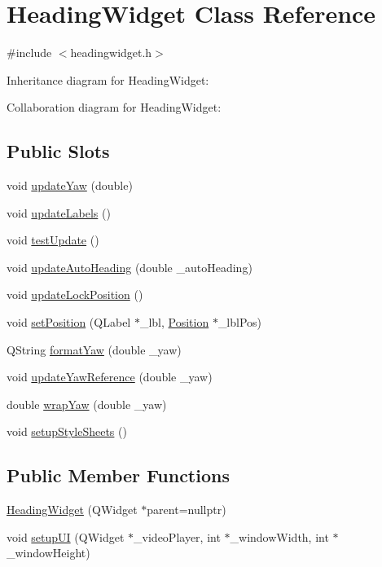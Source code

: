 \hypertarget{class_heading_widget}{}\section{Heading\+Widget Class Reference}
\label{class_heading_widget}


{\ttfamily \#include $<$headingwidget.\+h$>$}



Inheritance diagram for Heading\+Widget\+:


Collaboration diagram for Heading\+Widget\+:
\subsection*{Public Slots}
\begin{DoxyCompactItemize}
\item 
void \mbox{\hyperlink{class_heading_widget_a0ee18df2412d99bd9c2effe300679a6d}{update\+Yaw}} (double)
\item 
void \mbox{\hyperlink{class_heading_widget_a5970ad0efbbc29f3f1cc4222af237090}{update\+Labels}} ()
\item 
void \mbox{\hyperlink{class_heading_widget_a78bb0235f0f713e6d15367e257ec4957}{test\+Update}} ()
\item 
void \mbox{\hyperlink{class_heading_widget_aa83d96e53fc9087d61faa7ee9e812b16}{update\+Auto\+Heading}} (double \+\_\+auto\+Heading)
\item 
void \mbox{\hyperlink{class_heading_widget_abd5cbfa77478ba28e70c44f67fa6bd6f}{update\+Lock\+Position}} ()
\item 
void \mbox{\hyperlink{class_heading_widget_af5b9fd1a9b6268a73a486529e92ca9b1}{set\+Position}} (Q\+Label $\ast$\+\_\+lbl, \mbox{\hyperlink{class_position}{Position}} $\ast$\+\_\+lbl\+Pos)
\item 
Q\+String \mbox{\hyperlink{class_heading_widget_a9e14fb07916e6b5d242fb20695d5cc05}{format\+Yaw}} (double \+\_\+yaw)
\item 
void \mbox{\hyperlink{class_heading_widget_a4ac443944e857d2f9744704429ce4577}{update\+Yaw\+Reference}} (double \+\_\+yaw)
\item 
double \mbox{\hyperlink{class_heading_widget_a049dfd0b5fc1ad2d771130bde8516ab2}{wrap\+Yaw}} (double \+\_\+yaw)
\item 
void \mbox{\hyperlink{class_heading_widget_a23d83c2a9906e54385bf67d6a4df1bb0}{setup\+Style\+Sheets}} ()
\end{DoxyCompactItemize}
\subsection*{Public Member Functions}
\begin{DoxyCompactItemize}
\item 
\mbox{\hyperlink{class_heading_widget_a76d8f8a6de301d293ec59821819d6266}{Heading\+Widget}} (Q\+Widget $\ast$parent=nullptr)
\item 
void \mbox{\hyperlink{class_heading_widget_ab65afa6442eda14ec2f7cf56ae962404}{setup\+UI}} (Q\+Widget $\ast$\+\_\+video\+Player, int $\ast$\+\_\+window\+Width, int $\ast$\+\_\+window\+Height)
\end{DoxyCompactItemize}
